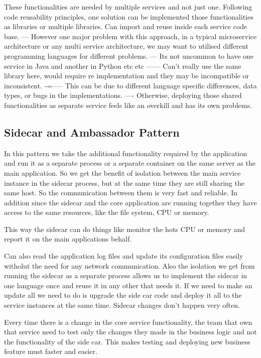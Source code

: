 These functionalities are needed by multiple services and not just one.
Following code reusability principles, one solution can be implemented those functionalities as libraries or multiple libraries.
Can import and reuse inside each service code base.
--- However one major problem with this approach, in a typical microservice architecture or any multi service architecture, we may want to utilised different programming languages for different problems.
--- Its not uncommon to have one service in Java and another in Python etc etc
------ Can't really use the same library here, would require re implementation and they may be incompatible or inconsistent.
-=----- This can be due to different language specific differences, data types, or bugs in the implementations.
---- Otherwise, deploying those shared functionalities as separate service feels like an overkill and has its own problems.

\subsection{Sidecar and Ambassador Pattern}
In this pattern we take the additional functionality required by the application and run it as a separate process or a separate container on the same server as the main application.
So we get the benefit of isolation between the main service instance in the sidecar process, but at the same time they are still sharing the same host.
So the communication between them is very fast and reliable.
In addition since the sidecar and the core application are running together they have access to the same resources, like the file system, CPU or memory.

This way the sidecar can do things like monitor the hots CPU or memory and report it on the main applications behalf.

Can also read the application log files and update its configuration files easily witholut the need for any network communication.
Also the isolation we get from running the sidecar as a separate process allows us to implement the sidecar in one language once and reuse it in any other that needs it.
If we need to make an update all we need to do is upgrade the side car code and deploy it all to the service instances at the same time.
Sidecar changes don't happen very often.

Every time there is a change in the core service functionality, the team that own that service need to test only the changes they made in the business logic and not the functionality of the side car.
This makes testing and deploying new business feature must faster and easier.


